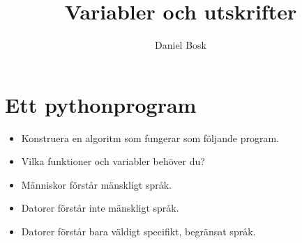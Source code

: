 \title{%
  Variabler och utskrifter
}
\author{Daniel Bosk}


\mode*

\begin{abstract}
  
\end{abstract}


\section{Ett pythonprogram}

\begin{frame}[fragile]
  \begin{exercise}
    \begin{itemize}
      \item Konstruera en algoritm som fungerar som följande 
        program.
      \item Vilka funktioner och variabler behöver du?
    \end{itemize}
  \end{exercise}
\end{frame}

\begin{frame}[fragile]
  \begin{remark}
    \begin{itemize}
      \item Människor förstår mänskligt språk.
      \item Datorer förstår inte mänskligt språk.
      \item Datorer förstår bara väldigt specifikt, begränsat språk.
    \end{itemize}
  \end{remark}
\end{frame}

\begin{frame}[fragile]
  \inputminted[linenos,firstline=11]{python}{examples/age.py}
\end{frame}

